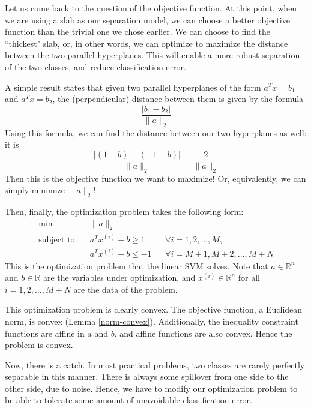 \documentclass[a4paper]{article}
\theoremstyle{definition}
\begin{document}
Let us come back to the question of the objective function.
At this point, when we are using a slab as our separation model, we can choose a better objective function than the trivial one we chose earlier.
We can choose to find the ``thickest" slab, or, in other words, we can optimize to maximize the distance between the two parallel hyperplanes.
This will enable a more robust separation of the two classes, and reduce classification error.

A simple result states that given two parallel hyperplanes of the form $a^T x = b_1$ and $a^T x = b_2$, the (perpendicular) distance between them is given by the formula
\begin{equation*}
	\frac{| b_1 - b_2 |}{\| a \|_2}
\end{equation*}
Using this formula, we can find the distance between our two hyperplanes as well: it is
\begin{equation*}
	\frac{| (1 - b) - (-1 - b) |}{\| a \|_2} = \frac{2}{\| a \|_2}
\end{equation*}
Then this is the objective function we want to maximize!
Or, equivalently, we can simply minimize $\| a \|_2$!

Then, finally, the optimization problem takes the following form:
\begin{equation}
	\label{hard-linear-svm}
	\begin{aligned}
		\min \quad & \| a \|_2 \\
		\text{subject to} \quad & a^T x^{(i)} + b \geq 1 && \forall i = 1, 2, \dots, M, \\
		& a^T x^{(i)} + b \leq -1 && \forall i = M{+}1, M{+}2, \dots, M{+}N
	\end{aligned}
\end{equation}
This is the optimization problem that the linear SVM solves.
Note that $a \in \mathbb{R}^n$ and $b \in \mathbb{R}$ are the variables under optimization, and $x^{(i)} \in \mathbb{R}^n$ for all $i = 1, 2, \dots, M{+}N$ are the data of the problem.

This optimization problem is clearly convex.
The objective function, a Euclidean norm, is convex (Lemma \ref{norm-convex}).
Additionally, the inequality constraint functions are affine in $a$ and $b$, and affine functions are also convex.
Hence the problem is convex.

Now, there is a catch.
In most practical problems, two classes are rarely perfectly separable in this manner.
There is always some spillover from one side to the other side, due to noise.
Hence, we have to modify our optimization problem to be able to tolerate some amount of unavoidable classification error.
\end{document}

